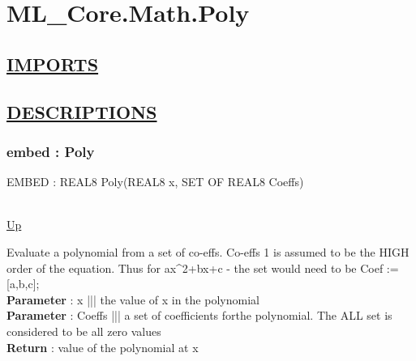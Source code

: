 \chapter*{ML\_Core.Math.Poly}
\hypertarget{ML_Core.Math.Poly}{}

\section*{\underline{IMPORTS}}

\section*{\underline{DESCRIPTIONS}}
\subsection*{embed : Poly}
\hypertarget{ecldoc:ml_core.math.poly}{EMBED : REAL8 Poly(REAL8 x, SET OF REAL8 Coeffs)} \\
\hyperlink{ecldoc:}{Up} \\
\par
Evaluate a polynomial from a set of co-effs. Co-effs 1 is assumed to be the HIGH order of the equation. Thus for ax\^{}2+bx+c - the set would need to be Coef := [a,b,c]; \\
\textbf{Parameter} : x ||| the value of x in the polynomial \\
\textbf{Parameter} : Coeffs ||| a set of coefficients forthe polynomial. The ALL set is considered to be all zero values \\
\textbf{Return} : value of the polynomial at x \\
